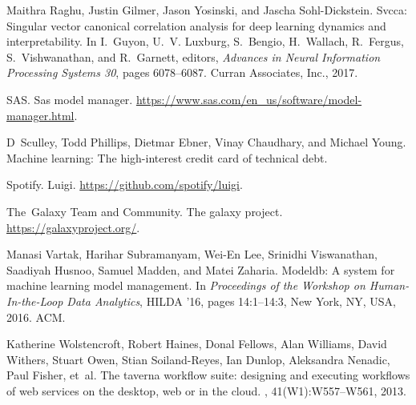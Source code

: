 \documentclass[11pt]{article}
\begin{document}
\begin{thebibliography}{10}
\begin{small}
Maithra Raghu, Justin Gilmer, Jason Yosinski, and Jascha Sohl-Dickstein.
\newblock Svcca: Singular vector canonical correlation analysis for deep
  learning dynamics and interpretability.
\newblock In I.~Guyon, U.~V. Luxburg, S.~Bengio, H.~Wallach, R.~Fergus,
  S.~Vishwanathan, and R.~Garnett, editors, {\em Advances in Neural Information
  Processing Systems 30}, pages 6078--6087. Curran Associates, Inc., 2017.

SAS.
\newblock Sas model manager.
\newblock \url{https://www.sas.com/en_us/software/model-manager.html}.

D~Sculley, Todd Phillips, Dietmar Ebner, Vinay Chaudhary, and Michael Young.
\newblock Machine learning: The high-interest credit card of technical debt.

Spotify.
\newblock Luigi.
\newblock \url{https://github.com/spotify/luigi}.

The~Galaxy Team and Community.
\newblock The galaxy project.
\newblock \url{https://galaxyproject.org/}.

Manasi Vartak, Harihar Subramanyam, Wei-En Lee, Srinidhi Viswanathan, Saadiyah
  Husnoo, Samuel Madden, and Matei Zaharia.
\newblock Modeldb: A system for machine learning model management.
\newblock In {\em Proceedings of the Workshop on Human-In-the-Loop Data
  Analytics}, HILDA '16, pages 14:1--14:3, New York, NY, USA, 2016. ACM.

Katherine Wolstencroft, Robert Haines, Donal Fellows, Alan Williams, David
  Withers, Stuart Owen, Stian Soiland-Reyes, Ian Dunlop, Aleksandra Nenadic,
  Paul Fisher, et~al.
\newblock The taverna workflow suite: designing and executing workflows of web
  services on the desktop, web or in the cloud.
, 41(W1):W557--W561, 2013.


\end{small}
\end{thebibliography}
\end{document}
